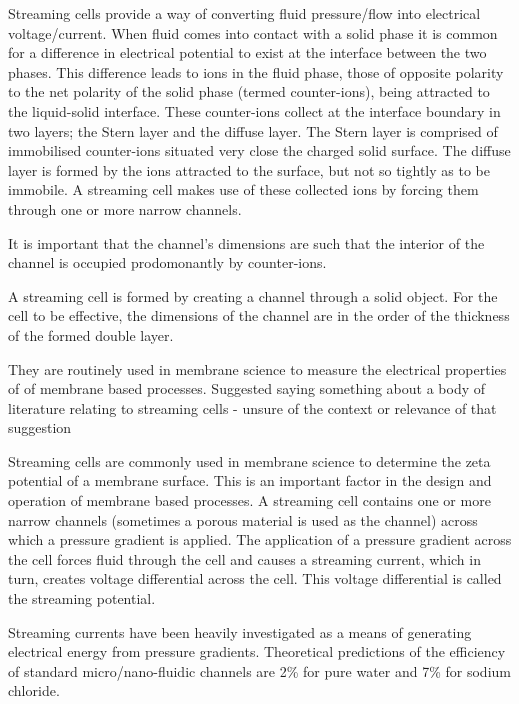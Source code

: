 \documentclass[10pt,final,journal]{IEEEtran}
\begin{document}
    Streaming cells provide a way of converting fluid pressure/flow into electrical voltage/current.
    When fluid comes into contact with a solid phase it is common for a difference in electrical potential to exist at the interface between the two phases.
    This difference leads to ions in the fluid phase, those of opposite polarity to the net polarity of the solid phase (termed counter-ions), being attracted to the liquid-solid interface.
    These counter-ions collect at the interface boundary in two layers; the Stern layer and the diffuse layer.
    The Stern layer is comprised of immobilised counter-ions situated very close the charged solid surface. \cite{Salieb-Beugelaar2009}
    The diffuse layer is formed by the ions attracted to the surface, but not so tightly as to be immobile.
    A streaming cell makes use of these collected ions by forcing them through one or more narrow channels.
    


    It is important that the channel's dimensions are such that the interior of the channel is occupied prodomonantly by counter-ions.



    A streaming cell is formed by creating a channel through a solid object.
    For the cell to be effective, the dimensions of the channel are in the order of the thickness of the formed double layer.





    They are routinely used in membrane science to measure the electrical properties of of membrane based processes. \cite{Daiguji2004b}
    {\color{blue} Suggested saying something about a body of literature relating to streaming cells - unsure of the context or relevance of that suggestion}

    Streaming cells are commonly used in membrane science to determine the zeta potential of a membrane surface.
    This is an important factor in the design and operation of membrane based processes.\cite{Daiguji2004b}
    A streaming cell contains one or more narrow channels (sometimes a porous material is used as the channel) across which a pressure gradient is applied.
    The application of a pressure gradient across the cell forces fluid through the cell and causes a streaming current, which in turn, creates voltage differential across the cell.
    This voltage differential is called the streaming potential.

    Streaming currents have been heavily investigated as a means of generating electrical energy from pressure gradients.
    \cite{Chang2009,Daiguji2006,Daiguji2004b,Davidson2008a,Davidson2008,CherngHon2012,Jiao2014,Lu2006,Olthuis2005,Osterle1964,Pennathur2007,Ren2008a,VanderHeyden2006,Heyden2007,Xie2008,Yang2003}
    Theoretical predictions of the efficiency of standard micro/nano-fluidic channels are 2\% for pure water and 7\% for sodium chloride.
    \cite{VanderHeyden2006}
\end{document}
